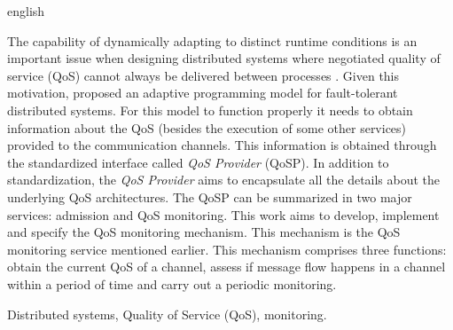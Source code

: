 %	

\begin{otherlanguage*}{english}
\abstract

	The capability of dynamically adapting to distinct runtime conditions is an important issue when designing distributed systems where negotiated quality of service (QoS) cannot always be delivered between processes \cite{GMCR07}. Given this motivation, \cite{GMCR07} proposed an adaptive programming model for fault-tolerant distributed systems. For this model to function properly it needs to obtain information about the QoS (besides the execution of some other services) provided to the communication channels. This information is obtained through the standardized interface called \textit{QoS Provider} (QoSP). In addition to standardization, the \textit{QoS Provider} aims to encapsulate all the details about the underlying QoS architectures. The QoSP can be summarized in two major services: admission and QoS monitoring. This work aims to develop, implement and specify the QoS monitoring mechanism. This mechanism is the QoS monitoring service mentioned earlier. This mechanism comprises three functions: obtain the current QoS of a channel, assess if message flow happens in a channel within a period of time and carry out a periodic monitoring.
		
\begin{keywords}
Distributed systems, Quality of Service (QoS), monitoring.
\end{keywords}
\end{otherlanguage*}
